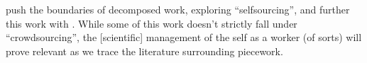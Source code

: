 \documentclass[trackingWork]{subfiles}
\begin{document}
\topic{}
\citeauthor{selfsourcingTeevan2014} push the boundaries of decomposed work,
exploring ``selfsourcing'', and further this work with \citeauthor{selfsourcingTeevan2016}
\cite{selfsourcingTeevan2014,selfsourcingTeevan2016}.
While some of this work doesn't strictly fall under ``crowdsourcing'',
the [scientific] management of the self as a worker
(of sorts)
will prove relevant as we trace the literature surrounding piecework.
\end{document}
